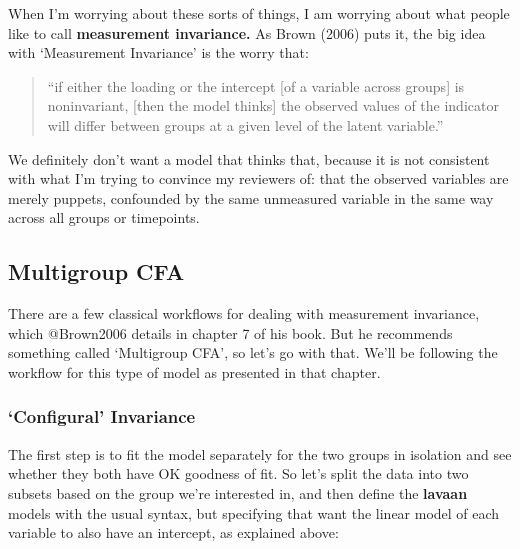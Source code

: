 \documentclass[
  letterpaper,
  DIV=11,
  numbers=noendperiod]{scrreprt}
\begin{document}
When I'm worrying about these sorts of things, I am worrying about what
people like to call \textbf{measurement invariance.} As Brown (2006)
puts it, the big idea with `Measurement Invariance' is the worry that:

\begin{quote}
``if either the loading or the intercept {[}of a variable across
groups{]} is noninvariant, {[}then the model thinks{]} the observed
values of the indicator will differ between groups at a given level of
the latent variable.''
\end{quote}

We definitely don't want a model that thinks that, because it is not
consistent with what I'm trying to convince my reviewers of: that the
observed variables are merely puppets, confounded by the same unmeasured
variable in the same way across all groups or timepoints.

\hypertarget{multigroup-cfa}{%
\subsection*{Multigroup CFA}\label{multigroup-cfa}}

There are a few classical workflows for dealing with measurement
invariance, which @Brown2006 details in chapter 7 of his book. But he
recommends something called `Multigroup CFA', so let's go with that.
We'll be following the workflow for this type of model as presented in
that chapter.

\hypertarget{configural-invariance}{%
\subsubsection*{`Configural' Invariance}\label{configural-invariance}}

The first step is to fit the model separately for the two groups in
isolation and see whether they both have OK goodness of fit. So let's
split the data into two subsets based on the group we're interested in,
and then define the \textbf{lavaan} models with the usual syntax, but
specifying that want the linear model of each variable to also have an
intercept, as explained above:
\end{document}
